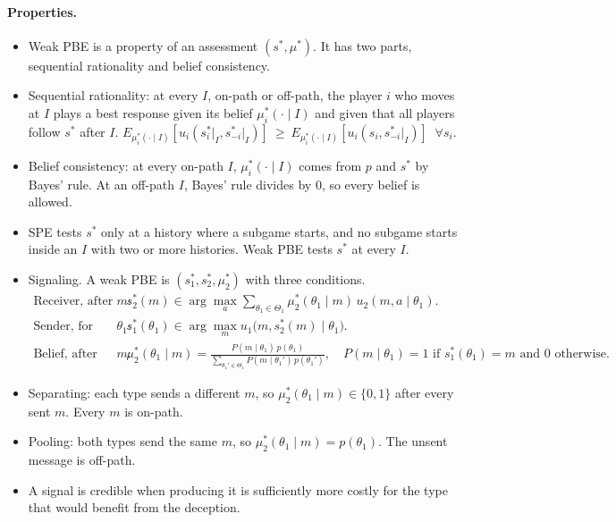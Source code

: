 \documentclass{article}
\begin{document}
\paragraph{Properties.}
\begin{itemize}
    \item Weak PBE is a property of an assessment $(s^*,\mu^*)$. It has two parts, sequential rationality and belief consistency.
    \item Sequential rationality: at every $I$, on-path or off-path, the player $i$ who moves at $I$ plays a best response given its belief $\mu_i^*(\cdot\mid I)$ and given that all players follow $s^*$ after $I$.
    $E_{\mu_i^*(\cdot\mid I)}[u_i(s_i^*\vert_I,s_{-i}^*\vert_I)]\ \ge\ E_{\mu_i^*(\cdot\mid I)}[u_i(s_i,s_{-i}^*\vert_I)]\;\;\forall s_i$.
    \item Belief consistency: at every on-path $I$, $\mu_i^*(\cdot\mid I)$ comes from $p$ and $s^*$ by Bayes' rule. At an off-path $I$, Bayes' rule divides by $0$, so every belief is allowed.
    \item SPE tests $s^*$ only at a history where a subgame starts, and no subgame starts inside an $I$ with two or more histories. Weak PBE tests $s^*$ at every $I$.
    \item Signaling. A weak PBE is $(s_1^*,s_2^*,\mu_2^*)$ with three conditions.
    \begin{align*}
        \text{Receiver, after every } m:\quad & s_2^*(m)\in\arg\max_{a}\sum_{\theta_1\in\Theta_1}\mu_2^*(\theta_1\mid m)\,u_2(m,a\mid\theta_1).\\
        \text{Sender, for every } \theta_1:\quad & s_1^*(\theta_1)\in\arg\max_{m}u_1\big(m,s_2^*(m)\mid\theta_1\big).\\
        \text{Belief, after every sent } m:\quad & \mu_2^*(\theta_1\mid m)=\frac{P(m\mid\theta_1)\,p(\theta_1)}{\sum_{\theta_1'\in\Theta_1}P(m\mid\theta_1')\,p(\theta_1')},\quad P(m\mid\theta_1)=1\text{ if }s_1^*(\theta_1)=m\text{ and }0\text{ otherwise}.
    \end{align*}
    \item Separating: each type sends a different $m$, so $\mu_2^*(\theta_1\mid m)\in\{0,1\}$ after every sent $m$. Every $m$ is on-path.
    \item Pooling: both types send the same $m$, so $\mu_2^*(\theta_1\mid m)=p(\theta_1)$. The unsent message is off-path.
    \item A signal is credible when producing it is sufficiently more costly for the type that would benefit from the deception.
\end{itemize}
\end{document}
